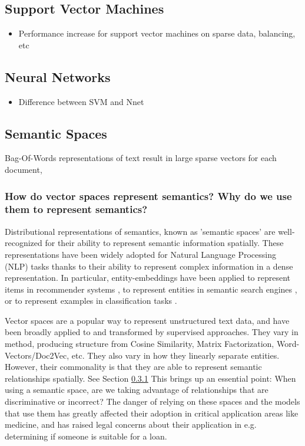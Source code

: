 \subsection{Support Vector Machines}\label{bg:SVM}
\begin{itemize}
	\item Performance increase for support vector machines on sparse data, balancing, etc
\end{itemize}
\subsection{Neural Networks}
\begin{itemize}
	\item Difference between SVM and Nnet
\end{itemize}
\subsection{Semantic Spaces}\label{bg:SemanticSpaces}
Bag-Of-Words representations of text result in large sparse vectors for each document, 


\subsubsection{How do vector spaces represent semantics? Why do we use them to represent semantics?}\label{background:WhySpace}
Distributional representations of semantics, known as 'semantic spaces' are well-recognized for their ability to represent semantic information spatially. These representations have been widely adopted for Natural Language Processing (NLP) tasks %
thanks to their ability to represent complex information in a dense representation. In particular, entity-embeddings have been applied  to represent items in recommender systems \cite{Vasile:2016:MPE:2959100.2959160,liang2016factorization,van2016learning}, to represent entities in semantic search engines \cite{DBLP:conf/sigir/JameelBS17,van2017structural}, or to represent examples in classification tasks \cite{DBLP:conf/iccv/DemirelCI17}. %

Vector spaces are a popular way to represent unstructured text data, and have been broadly applied to and transformed by supervised approaches. They vary in method, producing structure from Cosine Similarity, Matrix Factorization, Word-Vectors/Doc2Vec, etc. %
They also vary in how they linearly separate entities. %
However, their commonality is that they are able to represent semantic relationships spatially. %
See Section \ref{background:WhySpace}
This brings up an essential point: When using a semantic space, are we taking advantage of relationships that are discriminative or incorrect? The danger of relying on these spaces and the models that use them has greatly affected their adoption in critical application areas like medicine, %
and has raised legal concerns about their application in e.g. determining if someone is suitable for a loan. 

